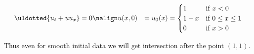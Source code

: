 \begin{examplebox}\nospacing
    \begin{example}\label{example:burgers_equation_continous_initial_data}
        \begin{align*}
              \uldotted{u_t+u u_x}&=0 \nonumber\nalign
              u(x,0)&=u_{0}(x)=\begin{cases}
                    1&\text{if }x<0\\
                    1-x&\text{if }0\leq x\leq 1\\
                    0&\text{if }x>0
                    \end{cases}
        \end{align*}
        \begin{figure}[H]
            \vspace{-1em}
            \centering{
              \def\svgwidth{210pt}
                \resizebox{\linewidth}{!}{}
            }
        \end{figure}
        \begin{figure}[H]
            \vspace{-3em}
            \centering{
              \def\svgwidth{130pt}
              \resizebox{0.7\linewidth}{!}{}
            }
        \end{figure}
        \vspace{-1em}
        Thus even for smooth initial data we will get intersection after the point $(1,1)$.
    \end{example}
\end{examplebox}
